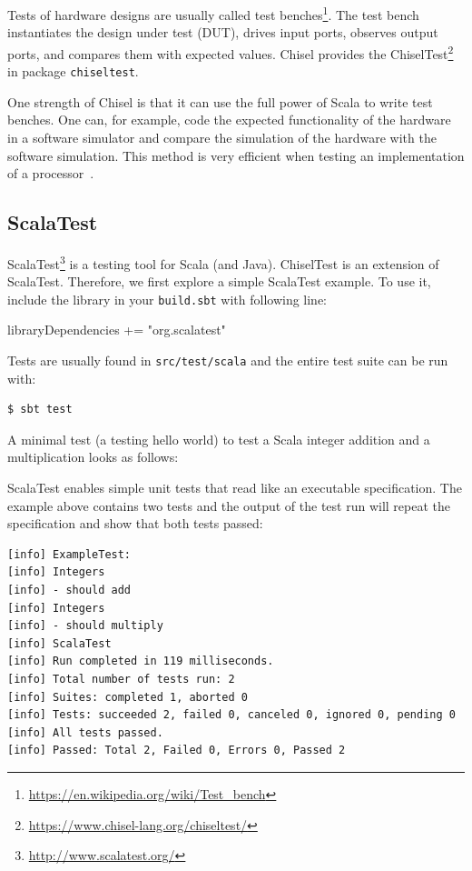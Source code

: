 \documentclass[%
    10pt,
    headinclude, footexclude,
    openright, %
    notitlepage,
    cleardoubleempty,
    headsepline,
    pointlessnumbers,
    bibtotoc, idxtotoc,
    ]{scrbook}
\newcommand{\code}[1]{{\small{\texttt{#1}}}}
\newcommand{\myref}[2]{\href{#1}{#2}}
\renewcommand{\myref}[2]{{#2}{\footnote{\url{#1}}}}
\begin{document}
Tests of hardware designs are usually called \myref{https://en.wikipedia.org/wiki/Test_bench}{test benches}.
The test bench instantiates the design under test (DUT), drives input ports, observes output ports,
and compares them with expected values.
Chisel provides the \myref{https://www.chisel-lang.org/chiseltest/}{ChiselTest}
in package \code{chiseltest}.

One strength of Chisel is that it can use the full power of Scala to write
test benches. One can, for example, code the expected functionality of the hardware
in a software simulator and compare the simulation of the hardware with the
software simulation. This method is very efficient when testing an implementation
of a processor~\cite{lipsi:arcs2018}.

\subsection{ScalaTest}

\myref{http://www.scalatest.org/}{ScalaTest} is a testing tool for Scala (and Java). ChiselTest is an extension
of ScalaTest. Therefore, we first explore a simple ScalaTest example. To use it, include the library
in your \code{build.sbt} with following line:

\begin{chisel}
libraryDependencies += "org.scalatest" %
\end{chisel}

\noindent Tests are usually found in \code{src/test/scala} and the entire test suite can be run with:

\begin{verbatim}
$ sbt test
\end{verbatim}

\noindent A minimal test (a testing hello world) to test a Scala integer
addition and a multiplication looks as follows:


ScalaTest enables simple unit tests that read like an executable specification.
The example above contains two tests and the output of the test run will repeat the specification
and show that both tests passed:

\begin{verbatim}
[info] ExampleTest:
[info] Integers
[info] - should add
[info] Integers
[info] - should multiply
[info] ScalaTest
[info] Run completed in 119 milliseconds.
[info] Total number of tests run: 2
[info] Suites: completed 1, aborted 0
[info] Tests: succeeded 2, failed 0, canceled 0, ignored 0, pending 0
[info] All tests passed.
[info] Passed: Total 2, Failed 0, Errors 0, Passed 2
\end{verbatim}
\end{document}
